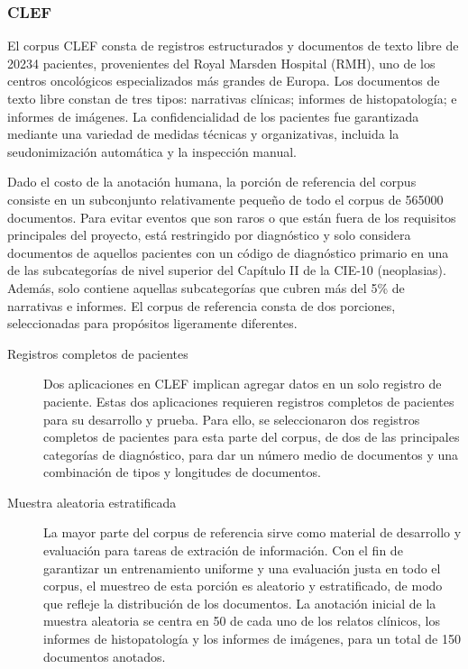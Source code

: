 \subsubsection*{CLEF}

El corpus CLEF consta de registros estructurados y documentos de texto libre de 20234 pacientes, provenientes del Royal Marsden Hospital (RMH), uno de los centros oncológicos especializados más grandes de Europa.
Los documentos de texto libre constan de tres tipos: narrativas clínicas; informes de histopatología; e informes de imágenes.
La confidencialidad de los pacientes fue garantizada mediante una variedad de medidas técnicas y organizativas, incluida la seudonimización automática y la inspección manual.

Dado el costo de la anotación humana, la porción de referencia del corpus consiste en un subconjunto relativamente pequeño de todo el corpus de 565000 documentos.
Para evitar eventos que son raros o que están fuera de los requisitos principales del proyecto, está restringido por diagnóstico y solo considera documentos de aquellos pacientes con un código de diagnóstico primario en una de las subcategorías de nivel superior del Capítulo II de la CIE-10 (neoplasias).
Además, solo contiene aquellas subcategorías que cubren más del 5\% de narrativas e informes.
El corpus de referencia consta de dos porciones, seleccionadas para propósitos ligeramente diferentes.

\begin{description}
  \item[Registros completos de pacientes]
        Dos aplicaciones en CLEF implican agregar datos en un solo registro de paciente.
        Estas dos aplicaciones requieren registros completos de pacientes para su desarrollo y prueba.
        Para ello, se seleccionaron dos registros completos de pacientes para esta parte del corpus, de dos de las principales categorías de diagnóstico, para dar un número medio de documentos y una combinación de tipos y longitudes de documentos.
  \item[Muestra aleatoria estratificada]
        La mayor parte del corpus de referencia sirve como material de desarrollo y evaluación para tareas de extración de información.
        Con el fin de garantizar un entrenamiento uniforme y una evaluación justa en todo el corpus, el muestreo de esta porción es aleatorio y estratificado, de modo que refleje la distribución de los documentos.
        La anotación inicial de la muestra aleatoria se centra en 50 de cada uno de los relatos clínicos, los informes de histopatología y los informes de imágenes, para un total de 150 documentos anotados.
\end{description}

